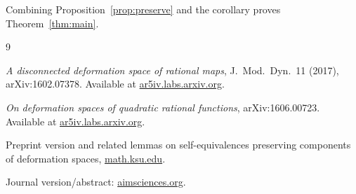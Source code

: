 \documentclass[11pt]{article}
\begin{document}
Combining Proposition~\ref{prop:preserve} and the corollary proves Theorem~\ref{thm:main}.

\begin{thebibliography}{9}

\emph{A disconnected deformation space of rational maps},
J.~Mod.~Dyn.~11 (2017), arXiv:1602.07378.
Available at
\href{https://ar5iv.labs.arxiv.org/html/1602.07378}{ar5iv.labs.arxiv.org}.

\emph{On deformation spaces of quadratic rational functions},
arXiv:1606.00723.
Available at
\href{https://ar5iv.labs.arxiv.org/html/1606.00723}{ar5iv.labs.arxiv.org}.

Preprint version and related lemmas on self-equivalences preserving components of deformation spaces,
\href{https://www.math.ksu.edu/~tanyaf/FKS.pdf}{math.ksu.edu}.

Journal version/abstract:
\href{https://www.aimsciences.org/article/doi/10.3934/jmd.2017016}{aimsciences.org}.

\end{thebibliography}
\end{document}

